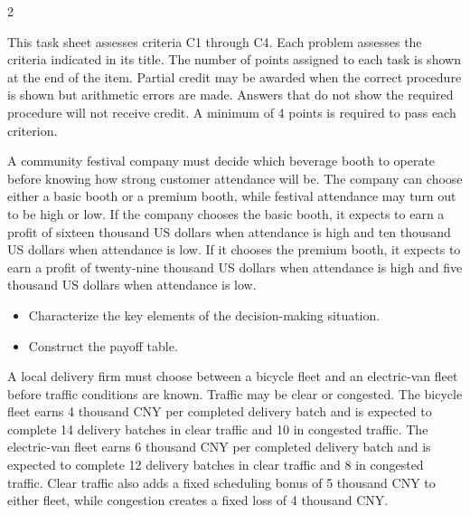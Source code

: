 	\begin{multicols}{2}
		
		This task sheet assesses criteria C1 through C4. Each problem assesses the criteria indicated in its title. The number of points assigned to each task is shown at the end of the item. Partial credit may be awarded when the correct procedure is shown but arithmetic errors are made. Answers that do not show the required procedure will not receive credit. A minimum of 4 points is required to pass each criterion.
		
		
		A community festival company must decide which beverage booth to operate before knowing how strong customer attendance will be. The company can choose either a basic booth or a premium booth, while festival attendance may turn out to be high or low. If the company chooses the basic booth, it expects to earn a profit of sixteen thousand US dollars when attendance is high and ten thousand US dollars when attendance is low. If it chooses the premium booth, it expects to earn a profit of twenty-nine thousand US dollars when attendance is high and five thousand US dollars when attendance is low.
		
		\begin{itemize}
			\item [\textbf{(C1)}] Characterize the key elements of the decision-making situation. 
			\item [\textbf{(C2)}] Construct the payoff table. 
		\end{itemize}
		
		\columnbreak 
		
		A local delivery firm must choose between a bicycle fleet and an electric-van fleet before traffic conditions are known. Traffic may be clear or congested. The bicycle fleet earns 4 thousand CNY per completed delivery batch and is expected to complete 14 delivery batches in clear traffic and 10 in congested traffic. The electric-van fleet earns 6 thousand CNY per completed delivery batch and is expected to complete 12 delivery batches in clear traffic and 8 in congested traffic. Clear traffic also adds a fixed scheduling bonus of 5 thousand CNY to either fleet, while congestion creates a fixed loss of 4 thousand CNY.
		

\end{multicols}
